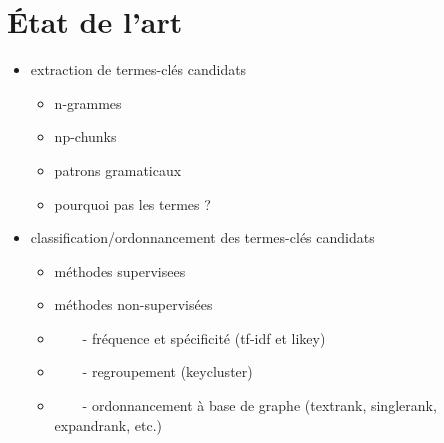\section{État de l'art}
\label{sec:etat_de_l_art}
  \begin{itemize}
    \item{extraction de termes-clés candidats}
    \begin{itemize}
      \item{n-grammes}
      \item{np-chunks}
      \item{patrons gramaticaux}
      \item{pourquoi pas les termes ?}
    \end{itemize}
    \item{classification/ordonnancement des termes-clés candidats}
    \begin{itemize}
      \item{méthodes supervisees}
      \item{méthodes non-supervisées}
      \item[]{~\ \ \ - fréquence et spécificité (tf-idf et likey)}
      \item[]{~\ \ \ - regroupement (keycluster)}
      \item[]{~\ \ \ - ordonnancement à base de graphe (textrank, singlerank, expandrank, etc.)}
    \end{itemize}
  \end{itemize}

